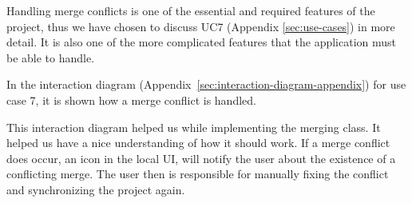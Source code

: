 Handling merge conflicts is one of the essential and required features of the project, thus we have chosen to discuss UC7 (Appendix \ref{sec:use-cases})
in more detail. It is also one of the more complicated features that the application must be able to handle.

In the interaction diagram (Appendix~\ref{sec:interaction-diagram-appendix}) for use case 7, it is shown how a merge conflict is handled. 

This interaction diagram helped us while implementing the merging class. It helped us have a nice understanding of how it should work. If
a merge conflict does occur, an icon in the local UI, will notify the user about the existence of a conflicting merge. The user then is responsible for manually 
fixing the conflict and synchronizing the project again.
